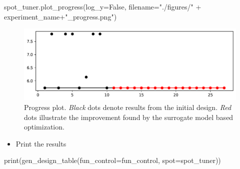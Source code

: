 \documentclass[
  letterpaper,
  DIV=11,
  numbers=noendperiod]{scrreprt}
\newenvironment{Shaded}{\begin{snugshade}}{\end{snugshade}}
\newcommand{\BuiltInTok}[1]{\textcolor[rgb]{0.00,0.23,0.31}{#1}}
\newcommand{\NormalTok}[1]{\textcolor[rgb]{0.00,0.23,0.31}{#1}}
\newcommand{\OperatorTok}[1]{\textcolor[rgb]{0.37,0.37,0.37}{#1}}
\newcommand{\StringTok}[1]{\textcolor[rgb]{0.13,0.47,0.30}{#1}}
\newcommand{\VariableTok}[1]{\textcolor[rgb]{0.07,0.07,0.07}{#1}}
\providecommand{\tightlist}{%
  \setlength{\itemsep}{0pt}\setlength{\parskip}{0pt}}\usepackage{longtable,booktabs,array}
\begin{document}
\begin{Shaded}
\begin{Highlighting}[]
\NormalTok{spot\_tuner.plot\_progress(log\_y}\OperatorTok{=}\VariableTok{False}\NormalTok{,}
\NormalTok{    filename}\OperatorTok{=}\StringTok{"./figures/"} \OperatorTok{+}\NormalTok{ experiment\_name}\OperatorTok{+}\StringTok{"\_progress.png"}\NormalTok{)}
\end{Highlighting}
\end{Shaded}

\begin{figure}[H]

{\centering \includegraphics{10_spot_hpt_sklearn_classification_files/figure-pdf/cell-22-output-1.pdf}

}

\caption{Progress plot. \emph{Black} dots denote results from the
initial design. \emph{Red} dots illustrate the improvement found by the
surrogate model based optimization.}

\end{figure}

\begin{itemize}
\tightlist
\item
  Print the results
\end{itemize}

\begin{Shaded}
\begin{Highlighting}[]
\BuiltInTok{print}\NormalTok{(gen\_design\_table(fun\_control}\OperatorTok{=}\NormalTok{fun\_control,}
\NormalTok{    spot}\OperatorTok{=}\NormalTok{spot\_tuner))}
\end{Highlighting}
\end{Shaded}
\end{document}
